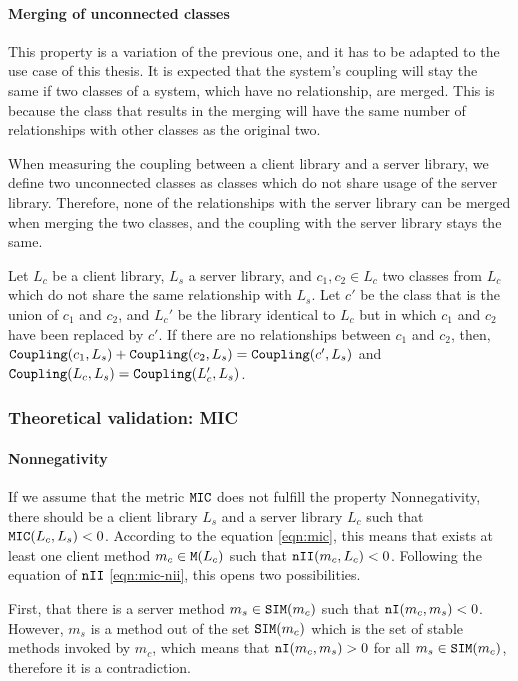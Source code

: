 \paragraph{Merging of unconnected classes}
This property is a variation of the previous one, and it has to be adapted to the use case of this thesis. It is expected that the system's coupling will stay the same if two classes of a system, which have no relationship, are merged. This is because the class that results in the merging will have the same number of relationships with other classes as the original two.

When measuring the coupling between a client library and a server library, we define two unconnected classes as classes which do not share usage of the server library. Therefore, none of the relationships with the server library can be merged when merging the two classes, and the coupling with the server library stays the same.

Let $L_c$ be a client library, $L_s$ a server library, and $c_1, c_2 \in L_c$ two classes from $L_c$ which do not share the same relationship with $L_s$. Let $c'$ be the class that is the union of  $c_1$ and $c_2$, and $L_c'$ be the library identical to $L_c$ but in which $c_1$ and $c_2$ have been replaced by $c'$. If there are no relationships between $c_1$ and $c_2$, then, $\verb|Coupling|(c_1, L_s) + \verb|Coupling|(c_2, L_s) = \verb|Coupling|(c', L_s)$ and $\verb|Coupling|(L_c, L_s) = \verb|Coupling|(L_c', L_s)$.

\subsubsection{Theoretical validation: MIC}

\paragraph{Nonnegativity}
If we assume that the metric $\verb|MIC|$ does not fulfill the property Nonnegativity, there should be a client library $L_s$ and a server library $L_c$ such that $\verb|MIC|(L_c, L_s) < 0$.
According to the equation \ref{eqn:mic}, this means that exists at least one client method $m_c \in \verb|M|(L_c)$ such that $\verb|nII|(m_c, L_c) < 0$. Following the equation of $\verb|nII|$ \ref{eqn:mic-nii}, this opens two possibilities.

First, that there is a server method $m_s \in \verb|SIM|(m_c)$ such that $\verb|nI|(m_c, m_s) < 0$. However, $m_s$ is a method out of the set $\verb|SIM|(m_c)$ which is the set of stable methods invoked by $m_c$, which means that $\verb|nI|(m_c, m_s) > 0$ for all $m_s \in \verb|SIM|(m_c)$, therefore it is a contradiction.

